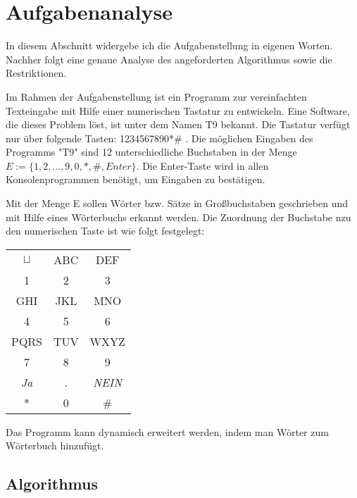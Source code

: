 %

\chapter{Aufgabenanalyse}

In diesem Abschnitt widergebe ich die Aufgabenstellung in eigenen Worten. Nachher folgt eine genaue Analyse des angeforderten Algorithmus sowie die Restriktionen.

Im Rahmen der Aufgabenstellung ist ein Programm zur vereinfachten Texteingabe mit Hilfe einer numerischen Tastatur zu entwickeln. Eine Software, die dieses Problem löst, ist unter dem Namen T9 bekannt. Die Tastatur verfügt nur über folgende Tasten: 1234567890*\# . Die möglichen Eingaben des Programms "T9" sind 12 unterschiedliche Buchstaben in der Menge $E:=\{1,2,...,9,0,*,\# ,Enter\}$. Die Enter-Taste wird in allen Konsolenprogrammen benötigt, um Eingaben zu bestätigen.

Mit der Menge E sollen Wörter bzw. Sätze in Großbuchstaben geschrieben und mit Hilfe eines Wörterbuchs erkannt werden.
Die Zuordnung der Buchstabe nzu den numerischen Taste ist wie folgt festgelegt:
\newline
\begin{table}[h!]
\begin{tabular}{ccc}
$\sqcup$ & ABC & DEF  \\
1        & 2   & 3    \\
GHI      & JKL & MNO  \\
4        & 5   & 6    \\
PQRS     & TUV & WXYZ \\
7        & 8   & 9    \\
\textit{Ja}       & .   & \textit{NEIN} \\
*        & 0   & \#  
\end{tabular}
\end{table}
\newline
Das Programm kann dynamisch erweitert werden, indem man Wörter zum Wörterbuch hinzufügt.

\section{Algorithmus}
\label{algorithmus}

